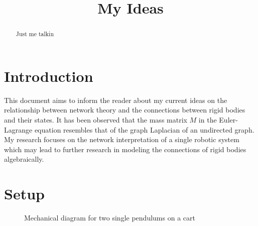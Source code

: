 \documentclass[conference]{IEEEtran}
\begin{document}
\title{My Ideas}

\author{}

\maketitle

\begin{abstract}
Just me talkin %
\end{abstract}

\section{Introduction}
This document aims to inform the reader about my current ideas on the relationship between network theory and the connections between rigid bodies and their states. It has been observed that the mass matrix $M$ in the Euler-Lagrange equation resembles that of the graph Laplacian of an undirected graph. My research focuses on the network interpretation of a single robotic system which may lead to further research in modeling the connections of rigid bodies algebraically.

\section{Setup}

\begin{figure}[htbp]
    \centering
    \caption{Mechanical diagram for two single pendulums on a cart}
    \label{fig:ssp_diagram}
\end{figure}
\end{document}
